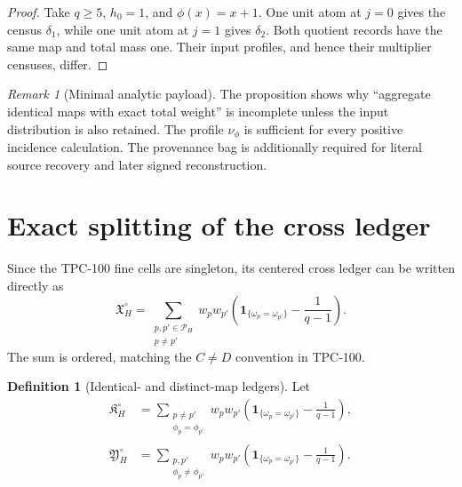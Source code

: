 \documentclass[11pt]{article}
\theoremstyle{definition}
\newtheorem{definition}[theorem]{Definition}
\theoremstyle{remark}
\newtheorem{remark}[theorem]{Remark}
\newcommand{\one}{\mathbf 1}
\begin{document}
\begin{proof}
Take \(q\ge5\), \(h_0=1\), and
\(\phi(x)=x+1\).  One unit atom at \(j=0\) gives the census
\(\delta_1\), while one unit atom at \(j=1\) gives
\(\delta_2\).  Both quotient records have the same map and total
mass one.  Their input profiles, and hence their multiplier
censuses, differ.
\end{proof}

\begin{remark}[Minimal analytic payload]
The proposition shows why ``aggregate identical maps with exact
total weight'' is incomplete unless the input distribution is also
retained.  The profile \(\nu_\phi\) is sufficient for every positive
incidence calculation.  The provenance bag is additionally required
for literal source recovery and later signed reconstruction.
\end{remark}

\section{Exact splitting of the cross ledger}
\label{sec:splitting}

Since the TPC-100 fine cells are singleton, its centered cross
ledger can be written directly as
\begin{equation}
 \mathfrak X_H^\circ
 =
 \sum_{\substack{p,p'\in\mathscr P_H\\p\ne p'}}
 w_pw_{p'}
 \left(
 \one_{\{\omega_p=\omega_{p'}\}}-\frac1{q-1}
 \right).
\label{eq:cross}
\end{equation}
The sum is ordered, matching the \(C\ne D\) convention in TPC-100.

\begin{definition}[Identical- and distinct-map ledgers]
\label{def:split}
Let
\begin{align}
 \mathfrak K_H^\circ
 &=
 \sum_{\substack{p\ne p'\\\phi_p=\phi_{p'}}}
 w_pw_{p'}
 \left(
 \one_{\{\omega_p=\omega_{p'}\}}-\frac1{q-1}
 \right),
\label{eq:K}\\
 \mathfrak Y_H^\circ
 &=
 \sum_{\substack{p,p'\\\phi_p\ne\phi_{p'}}}
 w_pw_{p'}
 \left(
 \one_{\{\omega_p=\omega_{p'}\}}-\frac1{q-1}
 \right).
\label{eq:Y}
\end{align}
\end{definition}
\end{document}
